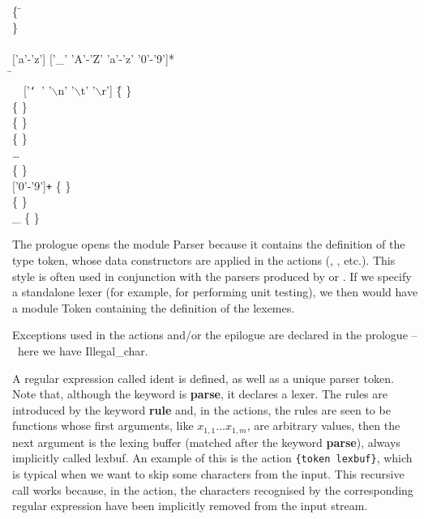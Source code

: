 \documentclass[12pt,a4paper]{article}
\begin{document}
\begin{tabbing}
\{ \= \Xopen {}\\
   \> \Xexception {} \Xof {} \}\\
\\
\Xlet {} \equal \textsf{['a'-'z'] ['\_' 'A'-'Z' 'a'-'z' '0'-'9']*}\\
\Xrule \=  \equal \Xparse\\
  \> \ \ \textsf{['{\tt\char`\ }' '\(\backslash\)n' '\(\backslash\)t'
   '\(\backslash\)r']} \= \{   \}\\
  \> \vbar{}  \> \{ \Tlet \}\\
  \> \vbar{}  \> \{ \Trec \}\\
  \> \vbar{} \str{=}   \> \{ \Tequal \}\\
  \> \ldots \\
  \> \vbar{}  \Xas {} \> \{ \Tident {} \}\\
  \> \vbar{} \textsf{['0'-'9']\texttt{+}} \Xas {} \> \{ \Tint
     \lpar{} \rpar{} \}\\
  \> \vbar{}  \> \{ \Teof \}\\
  \> \vbar{} {\large \_} \Xas {} \> \{ 
     \lpar{}  \rpar{} \}
\end{tabbing}
The prologue opens the module \textsf{Parser} because it contains the
definition of the type \textsf{token}, whose data constructors are
applied in the actions (, , etc.). This style is
often used in conjunction with the parsers produced by \menhir or
\ocamlyacc. If we specify a standalone lexer (for example, for
performing unit testing), we then would have a module \textsf{Token}
containing the definition of the lexemes.

Exceptions used in the actions and/or the epilogue are declared in the
prologue --~here we have \textsf{Illegal\_char}.

A regular expression called \textsf{ident} is defined, as well as a
unique parser \textsf{token}. Note that, although the \ocamllex
keyword is \textbf{\textsf{parse}}, it declares a lexer. The rules are
introduced by the keyword \textbf{\textsf{rule}} and, in the actions,
the rules are seen to be functions whose first arguments, like
\(x_{1,1} \dots x_{1,m}\), are arbitrary \OCaml values, then the next
argument is the lexing buffer (matched after the keyword
\textbf{\textsf{parse}}), always implicitly called \textsf{lexbuf}. An
example of this is the action \texttt{\{token lexbuf\}}, which is
typical when we want to skip some characters from the input. This
recursive call works because, in the action, the characters recognised
by the corresponding regular expression have been implicitly removed
from the input stream.
\end{document}
